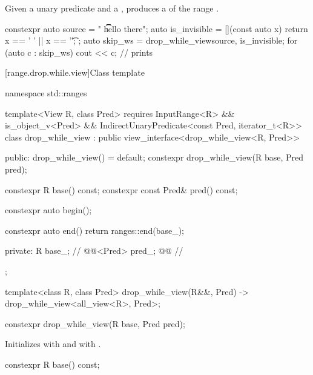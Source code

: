 \pnum
Given a unary predicate  and a  ,
 produces a 
of the range .

\pnum
\begin{example}
\begin{codeblock}
constexpr auto source = "  \t   \t   \t   hello there";
auto is_invisible = [](const auto x) { return x == ' ' || x == '\t'; };
auto skip_ws = drop_while_view{source, is_invisible};
for (auto c : skip_ws) {
  cout << c;                                    // prints 
}
\end{codeblock}
\end{example}

[range.drop.while.view]{Class template }

%
\begin{codeblock}
namespace std::ranges {
  template<View R, class Pred>
  requires InputRange<R> && is_object_v<Pred> &&
    IndirectUnaryPredicate<const Pred, iterator_t<R>>
  class drop_while_view : public view_interface<drop_while_view<R, Pred>> {
  public:
    drop_while_view() = default;
    constexpr drop_while_view(R base, Pred pred);

    constexpr R base() const;
    constexpr const Pred& pred() const;

    constexpr auto begin();

    constexpr auto end()
    { return ranges::end(base_); }

  private:
    R base_;                                            // \expos
    @@<Pred> pred_; @\itcorr[-1]@                       // \expos
  };

  template<class R, class Pred>
    drop_while_view(R&&, Pred) -> drop_while_view<all_view<R>, Pred>;
}
\end{codeblock}

%
\begin{itemdecl}
constexpr drop_while_view(R base, Pred pred);
\end{itemdecl}

\begin{itemdescr}
\pnum
\effects
Initializes  with  and
 with .
\end{itemdescr}

%
\begin{itemdecl}
constexpr R base() const;
\end{itemdecl}

